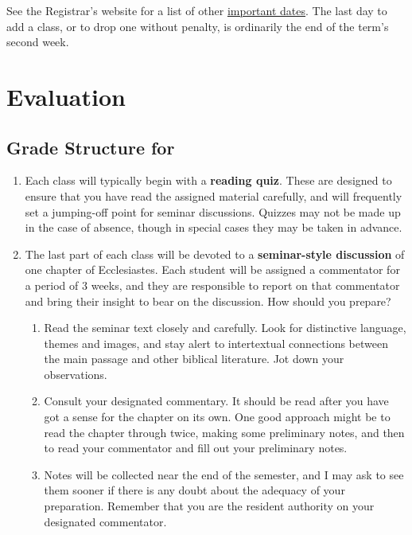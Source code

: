 \documentclass[titlepage]{article}
\begin{document}
See the Registrar's website for a list of other
\href{http://www.tyndale.ca/registrar/important-dates}{important dates}.
The last day to add a class, or to drop one without penalty, is
ordinarily the end of the term's second week.

\section{Evaluation}
\label{evaluation}

\subsection{Grade Structure for \ccode}
\label{structure}

\begin{enumerate}

	\item Each class will typically begin with a \textbf{reading quiz}.
	These are designed to ensure that you have read the assigned
	material carefully, and will frequently set a jumping-off point for
	seminar discussions. Quizzes may not be made up in the case of
	absence, though in special cases they may be taken in advance.

	\item The last part of each class will be devoted to a
	\textbf{seminar-style discussion} of one chapter of Ecclesiastes.
	Each student will be assigned a commentator for a period of 3 weeks,
	and they are responsible to report on that commentator and bring
	their insight to bear on the discussion. How should you prepare?

	\begin{enumerate}

		\item Read the seminar text closely and carefully. Look for
		distinctive language, themes and images, and stay alert to
		intertextual connections between the main passage and other
		biblical literature. Jot down your observations.

		\item Consult your designated commentary. It should be read
		after you have got a sense for the chapter on its own. One good
		approach might be to read the chapter through twice, making some
		preliminary notes, and then to read your commentator and fill
		out your preliminary notes.

		\item Notes will be collected near the end of the semester, and
		I may ask to see them sooner if there is any doubt about the
		adequacy of your preparation. Remember that you are the resident
		authority on your designated commentator.


\end{enumerate}
\end{enumerate}
\end{document}
